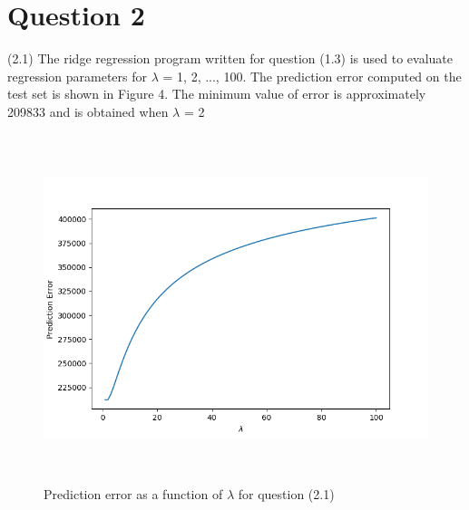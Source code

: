 \section*{Question 2}
(2.1) The ridge regression program written for question (1.3) is used to evaluate regression parameters for $\lambda$ = 1, 2, ..., 100. The prediction error computed on the test set is shown in Figure 4. The minimum value of error is approximately 209833 and is obtained when $\lambda$ = 2
\begin{figure}[h!]
    \centering
    \includegraphics[height=4in]{Figure_4.png}
    \caption{Prediction error as a function of $\lambda$ for question (2.1)}
\end{figure}
\vspace{5mm}

